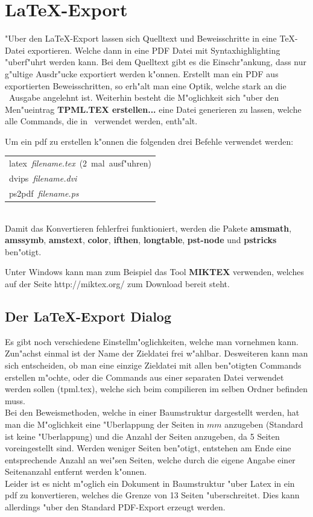 \section {\LaTeX -Export}
\label{Latex-Export}
"Uber den \LaTeX -Export lassen sich Quelltext und Beweisschritte in eine TeX-Datei
exportieren. Welche dann in eine PDF Datei mit Syntaxhighlighting "uberf"uhrt werden kann.
Bei dem Quelltext gibt es die Einschr"ankung, dass nur g"ultige Ausdr"ucke exportiert
werden k"onnen. Erstellt man ein PDF aus exportierten
Beweisschritten, so erh"alt man eine Optik, welche stark an die \TPML\ Ausgabe angelehnt ist.
Weiterhin besteht die M"oglichkeit sich "uber den Men"ueintrag {\bf TPML.TEX erstellen...}
eine Datei generieren zu lassen, welche alle Commands, die in \TPML\ verwendet werden, enth"alt.


Um ein pdf zu erstellen k"onnen die folgenden drei Befehle verwendet werden:\\[5mm]
\begin{tabular}{l}
	\mbox{latex \textit{filename.tex} (2 mal ausf"uhren)}\\[3mm]
	\mbox{dvips \textit{filename.dvi}}\\[3mm]
	\mbox{ps2pdf \textit{filename.ps}}
\end{tabular}\\[3mm]

Damit das Konvertieren fehlerfrei funktioniert, werden die Pakete {\bf amsmath}, {\bf amssymb}, 
{\bf amstext}, {\bf color}, {\bf ifthen}, {\bf longtable}, {\bf pst-node} und {\bf pstricks}
ben"otigt.

Unter Windows kann man zum Beispiel das Tool {\bf MIKTEX} verwenden, welches auf der Seite
http://miktex.org/ zum Download bereit steht.

\subsection {Der \LaTeX -Export Dialog}
Es gibt noch verschiedene Einstellm"oglichkeiten, welche man vornehmen kann. Zun"achst einmal
ist der Name der Zieldatei frei w"ahlbar. Desweiteren kann man sich entscheiden, ob man eine
einzige Zieldatei mit allen ben"otigten Commands erstellen m"ochte, oder die Commands aus einer
separaten Datei verwendet werden sollen (tpml.tex), welche sich beim compilieren im selben Ordner 
befinden muss.\\ 
Bei den Beweismethoden, welche in einer Baumstruktur dargestellt werden, hat man
die M"oglichkeit eine "Uberlappung der Seiten in $mm$ anzugeben (Standard ist keine "Uberlappung)
und die Anzahl der Seiten anzugeben, da 5 Seiten voreingestellt sind. Werden weniger Seiten
ben"otigt, entstehen am Ende eine entsprechende Anzahl an wei"sen Seiten, welche durch die
eigene Angabe einer Seitenanzahl entfernt werden k"onnen.\\
Leider ist es nicht m"oglich ein Dokument
in Baumstruktur "uber Latex in ein pdf zu konvertieren, welches die Grenze von 13 Seiten 
"uberschreitet. Dies kann allerdings "uber den Standard PDF-Export erzeugt werden.




